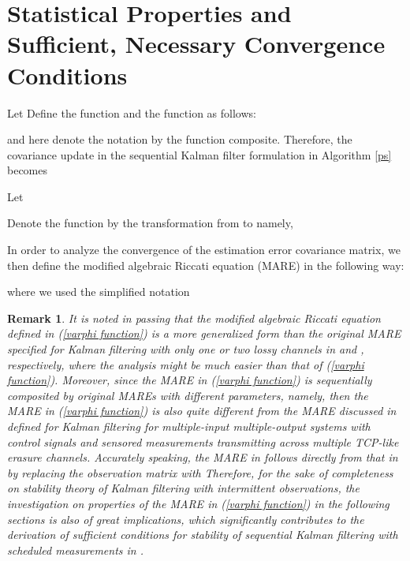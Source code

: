 \documentclass[journal]{IEEEtran}
\newtheorem{remark}{Remark}
\begin{document}
\section{Statistical Properties and Sufficient, Necessary Convergence Conditions}
\label{section c}
{\color{black}{In this section, the convergence conditions for the expected estimation error covariance will be provided by discussing properties of a constructed function. Denote   and   Since they are inherently stochastic and cannot be determined offline, therefore, only statistical properties can be derived. Before delving into main results, some preliminaries will be given in the following.}}

Let   Define the function  and the function  as follows:

and here denote the notation  by the function composite.
Therefore, the covariance update in the sequential Kalman filter formulation in Algorithm \ref{ps} becomes

Let

Denote the function  by the transformation from  to  namely,


In order to analyze the convergence of the estimation error covariance matrix, we then define the modified algebraic Riccati equation (MARE) in the following way:

where we used the simplified notation  {\color{black}{Meanwhile, as explained, the covariance matrices  depend nonlinearly on the specific realization of the stochastic processes  and  so the sequential Kalman filter is inherently stochastic and cannot be determined offline. Then, only statistical properties with respect to the covariance matrices of the proposed sequential Kalman filter can therefore be established.}}
\begin{remark}
\label{remark mare}
It is noted in passing that the modified algebraic Riccati equation defined in (\ref{varphi function}) is a more generalized form than the original MARE specified for Kalman filtering with only one or two lossy channels in \cite{tac2004sinopoli} and \cite{cdc2004goldsmith}, respectively, where the analysis might be much easier than that of (\ref{varphi function}). Moreover, since the MARE in (\ref{varphi function}) is sequentially composited by  original MAREs with different parameters, namely,  then the MARE in (\ref{varphi function}) is also quite different from the MARE discussed in \cite{tac2012sinopoli} defined for Kalman filtering for multiple-input multiple-output systems with control signals and sensored measurements transmitting across multiple TCP-like erasure channels. Accurately speaking, the MARE in \cite{tac2012sinopoli} follows directly from that in \cite{tac2004sinopoli} by replacing the observation matrix  with  Therefore, for the sake of completeness on stability theory of Kalman filtering with intermittent observations, the investigation on properties of the MARE in (\ref{varphi function}) in the following sections is also of great implications, which significantly contributes to the derivation of sufficient conditions for stability of sequential Kalman filtering with scheduled measurements in \cite{tsp2012you}.
\end{remark}
\end{document}
